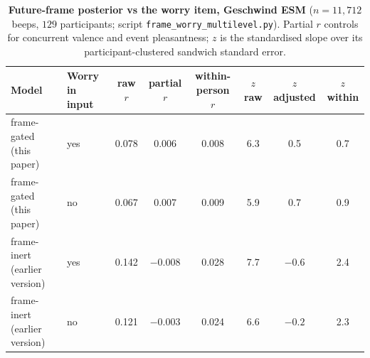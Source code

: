 \documentclass[11pt,a4paper]{article}
\begin{document}
\begin{table}[htbp]
\centering\small
\caption{\textbf{Future-frame posterior vs the worry item, Geschwind ESM}
($n=11{,}712$ beeps, $129$ participants; script \texttt{frame\_worry\_multilevel.py}).
Partial $r$ controls for concurrent valence and event pleasantness; $z$ is the
standardised slope over its participant-clustered sandwich standard error.}
\label{tab:worry}
\begin{tabular}{llcccccc}
\toprule
Model & Worry in input & raw $r$ & partial $r$ & within-person $r$ & $z$ raw & $z$ adjusted & $z$ within \\
\midrule
frame-gated (this paper) & yes & 0.078 & 0.006 & 0.008 & 6.3 & 0.5 & 0.7 \\
frame-gated (this paper) & no & 0.067 & 0.007 & 0.009 & 5.9 & 0.7 & 0.9 \\
frame-inert (earlier version) & yes & 0.142 & $-0.008$ & 0.028 & 7.7 & $-0.6$ & 2.4 \\
frame-inert (earlier version) & no & 0.121 & $-0.003$ & 0.024 & 6.6 & $-0.2$ & 2.3 \\
\bottomrule
\end{tabular}
\end{table}
\end{document}
